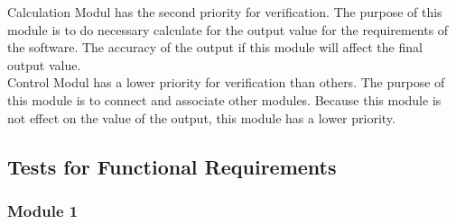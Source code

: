 \documentclass[12pt, titlepage]{article}
\begin{document}
Calculation Modul has the second priority for verification. The purpose of this module is to do necessary calculate for the output value for the requirements of the software. The accuracy of the output if this module will affect the final output value.\\

Control Modul has a lower priority for verification than others. The purpose of this module is to connect and associate other modules. Because this module is not effect on the value of the output, this module has a lower priority.


\subsection{Tests for Functional Requirements}


\subsubsection{Module 1}

\end{document}

